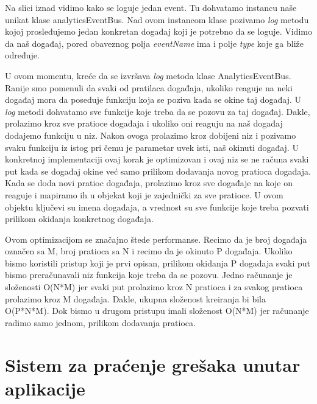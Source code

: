 \documentclass[12pt,oneside]{memoir}
\begin{document}
Na slici iznad vidimo kako se loguje jedan event. Tu dohvatamo instancu naše unikat klase analyticsEventBus. Nad ovom instancom klase pozivamo \textit{log} metodu kojoj prosleđujemo jedan konkretan događaj koji je potrebno da se loguje. Vidimo da naš događaj, pored obaveznog polja \textit{eventName} ima i polje \textit{type} koje ga bliže određuje. \newline

U ovom momentu, kreće da se izvršava \textit{log} metoda klase AnalyticsEventBus. Ranije smo pomenuli da svaki od pratilaca događaja, ukoliko reaguje na neki događaj mora da poseduje funkciju koja se poziva kada se okine taj događaj. U \textit{log} metodi dohvatamo sve funkcije koje treba da se pozovu za taj događaj. Dakle, prolazimo kroz sve pratioce događaja i ukoliko oni reaguju na naš događaj dodajemo funkciju u niz. Nakon ovoga prolazimo kroz dobijeni niz i pozivamo svaku funkciju iz istog pri čemu je parametar uvek isti, naš okinuti događaj. U konkretnoj implementaciji ovaj korak je optimizovan i ovaj niz se ne računa svaki put kada se događaj okine već samo prilikom dodavanja novog pratioca događaja. Kada se doda novi pratioc događaja, prolazimo kroz sve događaje na koje on reaguje i mapiramo ih u objekat koji je zajednički za sve pratioce. U ovom objektu ključevi su imena događaja, a vrednost su sve funkcije koje treba pozvati prilikom okidanja konkretnog događaja. \newline

Ovom optimizacijom se značajno štede performanse. Recimo da je broj događaja označen sa M, broj pratioca sa N i recimo da je okinuto P događaja. Ukoliko bismo koristili pristup koji je prvi opisan, prilikom okidanja P događaja svaki put bismo preračunavali niz funkcija koje treba da se pozovu. Jedno računanje je složenosti O(N*M) jer svaki put prolazimo kroz N pratioca i za svakog pratioca prolazimo kroz M događaja. Dakle, ukupna složenost kreiranja bi bila O(P*N*M). Dok bismo u drugom pristupu imali složenost O(N*M) jer računanje radimo samo jednom, prilikom dodavanja pratioca.

\chapter{Sistem za praćenje grešaka unutar aplikacije}
\end{document}

